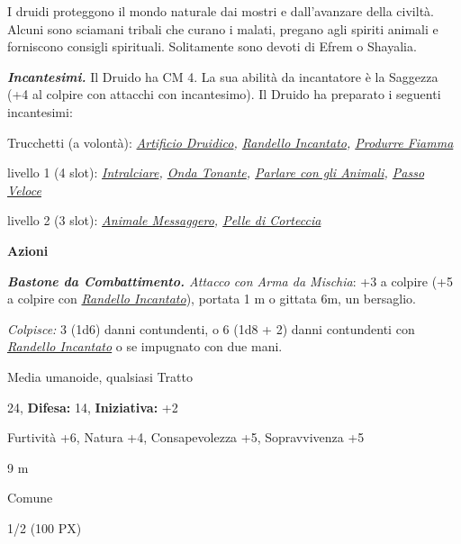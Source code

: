 \begin{multicols}{2}
{I druidi proteggono il mondo naturale dai mostri e dall'avanzare della civiltà. Alcuni sono sciamani tribali che curano i malati, pregano agli spiriti animali e forniscono consigli spirituali. Solitamente sono devoti di Efrem o Shayalia.

\emph{\textbf{Incantesimi.}} Il Druido ha CM 4. La sua abilità da incantatore è la Saggezza (+4 al colpire con attacchi con incantesimo). Il Druido ha preparato i seguenti incantesimi:

Trucchetti (a volontà): \emph{\hyperlink{Artificio Druidico}{Artificio Druidico}, \hyperlink{Randello Incantato}{Randello Incantato}, \hyperlink{Produrre Fiamma}{Produrre Fiamma}}

livello 1 (4 slot): \emph{\hyperlink{Intralciare}{Intralciare}, \hyperlink{Onda Tonante}{Onda Tonante}, \hyperlink{Parlare con gli Animali}{Parlare con gli Animali}, \hyperlink{Passo Veloce}{Passo Veloce}}

livello 2 (3 slot): \emph{\hyperlink{Animale Messaggero}{Animale Messaggero}, \hyperlink{Pelle di Corteccia}{Pelle di Corteccia}}

\textbf{Azioni}

\emph{\textbf{Bastone da Combattimento.} Attacco con Arma da Mischia}: +3 a colpire (+5 a colpire con \emph{\hyperlink{Randello Incantato}{Randello Incantato}}), portata 1 m o gittata 6m, un bersaglio.

\emph{Colpisce:} 3 (1d6) danni contundenti, o 6 (1d8 + 2) danni contundenti con \emph{\hyperlink{Randello Incantato}{Randello Incantato}} o se impugnato con due mani.

\begin{description}[noitemsep, topsep=0pt, parsep=0pt, partopsep=0pt, leftmargin=0cm, labelwidth=2.2cm]
    \item[\textbf{Taglia/Tipo:}] Media umanoide, qualsiasi Tratto
    \item[\textbf{Caratt.:}] 
    \item[\textbf{Punti Ferita:}] 24,  \textbf{Difesa:} 14,  \textbf{Iniziativa:} +2
    \item[\textbf{Comp.:}] Furtività +6, Natura +4, Consapevolezza +5, Sopravvivenza +5
    \item[\textbf{Tiri Salvez.:}] 
    \item[\textbf{Movimento:}] 9 m
    \item[\textbf{Linguaggi:}] Comune
    \item[\textbf{Sfida:}] 1/2 (100 PX)\smallskip
\end{description}

}
\end{multicols}
